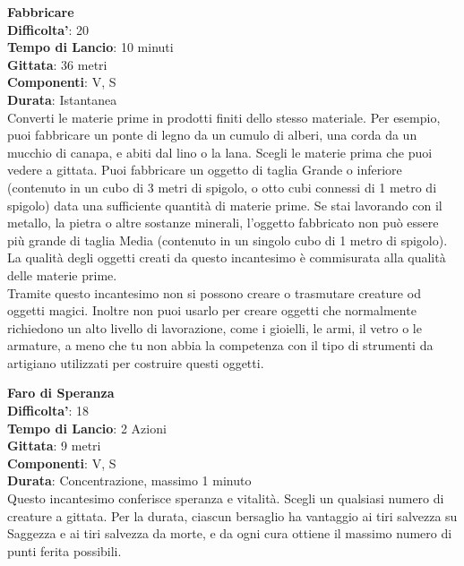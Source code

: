 \begin{multicols}{2}
\medskip\textbf{Fabbricare}\\
\textbf{Difficolta'}: 20\\
\textbf{Tempo di Lancio}: 10 minuti\\
\textbf{Gittata}: 36 metri\\
\textbf{Componenti}: V, S\\
\textbf{Durata}: Istantanea\\
Converti le materie prime in prodotti finiti dello stesso materiale. Per esempio, puoi fabbricare un ponte di legno da un cumulo di alberi, una corda da un mucchio di canapa, e abiti dal lino o la lana. Scegli le materie prima che puoi vedere a gittata. Puoi fabbricare un oggetto di taglia Grande o inferiore (contenuto in un cubo di 3 metri di spigolo, o otto cubi connessi di 1 metro di spigolo) data una sufficiente quantità di materie prime. Se stai lavorando con il metallo, la pietra o altre sostanze minerali, l’oggetto fabbricato non può essere più grande di taglia Media (contenuto in un singolo cubo di 1 metro di spigolo). La qualità degli oggetti creati da questo incantesimo è commisurata alla qualità delle materie prime.\\
Tramite questo incantesimo non si possono creare o trasmutare creature od oggetti magici. Inoltre non puoi usarlo per creare oggetti che normalmente richiedono un alto livello di lavorazione, come i gioielli, le armi, il vetro o le armature, a meno che tu non abbia la competenza con il tipo di strumenti da artigiano utilizzati per costruire questi oggetti.

\medskip\textbf{Faro di Speranza}\\
\textbf{Difficolta'}: 18\\
\textbf{Tempo di Lancio}: 2 Azioni\\
\textbf{Gittata}: 9 metri\\
\textbf{Componenti}: V, S\\
\textbf{Durata}: Concentrazione, massimo 1 minuto\\
Questo incantesimo conferisce speranza e vitalità. Scegli un qualsiasi numero di creature a gittata. Per la durata, ciascun bersaglio ha vantaggio ai tiri salvezza su Saggezza e ai tiri salvezza da morte, e da ogni cura ottiene il massimo numero di punti ferita possibili.


\end{multicols}
